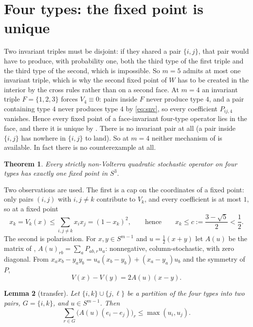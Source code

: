 \documentclass[11pt]{amsart}
\newtheorem{theorem}{Theorem}[section]
\newtheorem{lemma}[theorem]{Lemma}
\theoremstyle{definition}
\newcommand{\Simp}{S^{m-1}}
\begin{document}
\section{Four types: the fixed point is unique}\label{sec:four}

Two invariant triples must be disjoint: if they shared a pair $\{i,j\}$, that pair would have to produce, with probability one, both the third type of the first triple and the third type of the second, which is impossible. So $m=5$ admits at most one invariant triple, which is why the second fixed point of $W$ has to be created in the interior by the cross rules rather than on a second face. At $m=4$ an invariant triple $F=\{1,2,3\}$ forces $V_4\equiv0$: pairs inside $F$ never produce type $4$, and a pair containing type $4$ never produces type $4$ by \eqref{eq:snv}, so every coefficient $P_{ij,4}$ vanishes. Hence every fixed point of a face-invariant four-type operator lies in the face, and there it is unique by . There is no invariant pair at all (a pair inside $\{i,j\}$ has nowhere in $\{i,j\}$ to land). So at $m=4$ neither mechanism of  is available. In fact there is no counterexample at all.

\begin{theorem}\label{thm:four}
Every strictly non-Volterra quadratic stochastic operator on four types has exactly one fixed point in $S^3$.
\end{theorem}

Two observations are used. The first is a cap on the coordinates of a fixed point: only pairs $(i,j)$ with $i,j\ne k$ contribute to $V_k$, and every coefficient is at most $1$, so at a fixed point
\begin{equation}\label{eq:cap}
x_k=V_k(x)\le\sum_{i,j\ne k}x_ix_j=(1-x_k)^2,\qquad\text{hence}\qquad x_k\le c:=\frac{3-\sqrt5}{2}<\frac12 .
\end{equation}
The second is polarisation. For $x,y\in\Simp$ and $u=\frac12(x+y)$ let $A(u)$ be the matrix of , $A(u)_{rb}=\sum_aP_{ab,r}u_a$: nonnegative, column-stochastic, with zero diagonal. From $x_ax_b-y_ay_b=u_a(x_b-y_b)+(x_a-y_a)u_b$ and the symmetry of $P$,
\begin{equation}\label{eq:polar}
V(x)-V(y)=2A(u)(x-y).
\end{equation}

\begin{lemma}[transfer]\label{lem:transfer}
Let $\{i,k\}\cup\{j,\ell\}$ be a partition of the four types into two pairs, $G=\{i,k\}$, and $u\in\Simp$. Then
\[
\sum_{r\in G}\big(A(u)(e_i-e_j)\big)_r\le\max(u_i,u_j).
\]
\end{lemma}
\end{document}
